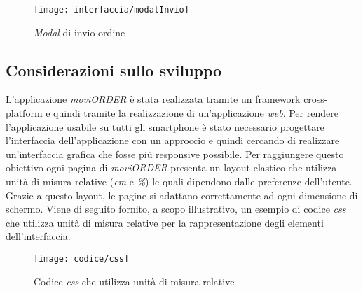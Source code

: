 \begin{figure}[!h] 
    \centering 
    \texttt{[image: interfaccia/modalInvio]} 
    \caption{\textit{Modal} di invio ordine}
\end{figure}

\subsection{Considerazioni sullo sviluppo}

L'applicazione \textit{moviORDER} è stata realizzata tramite un framework cross-platform e quindi tramite la realizzazione di un'applicazione \textit{web}. Per rendere l'applicazione usabile su tutti gli smartphone è stato necessario progettare l'interfaccia dell'applicazione con un approccio  e quindi cercando di realizzare un'interfaccia grafica che fosse più responsive possibile. Per raggiungere questo obiettivo ogni pagina di \textit{moviORDER} presenta un layout elastico che utilizza unità di misura relative (\textit{em} e \textit{\%}) le quali dipendono dalle preferenze dell'utente. Grazie a questo layout, le pagine si adattano correttamente ad ogni dimensione di schermo. Viene di seguito fornito, a scopo illustrativo, un esempio di codice \textit{css} che utilizza unità di misura relative per la rappresentazione degli elementi dell'interfaccia.

\begin{figure}[!h] 
    \centering 
    \texttt{[image: codice/css]} 
    \caption{Codice \textit{css} che utilizza unità di misura relative}
\end{figure}